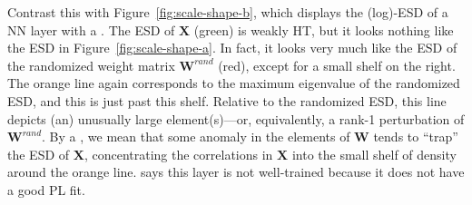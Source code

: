 Contrast this with Figure~\ref{fig:scale-shape-b}, which displays the (log)-ESD of a NN layer with a \CorrelationTrap.
The ESD of $\mathbf{X}$ (green) is weakly HT, but it looks nothing like the ESD in Figure~\ref{fig:scale-shape-a}.
In fact, it looks very much like the ESD of the randomized weight matrix  $\mathbf{W}^{rand}$ (red), except for a small shelf on the right. 
The orange line again corresponds to the maximum eigenvalue of the randomized ESD, and this is just past this shelf.
Relative to the randomized ESD, this line depicts (an) unusually large element(s)---or, equivalently, a rank-1 perturbation of $\mathbf{W}^{rand}$.
By a \CorrelationTrap, we mean that some anomaly in the elements of $\mathbf{W}$ tends to ``trap'' the ESD of $\mathbf{X}$, concentrating the correlations in $\mathbf{X}$ into the small shelf of density around the orange line. 
\HTSR says this layer is not well-trained because it does not have a good PL fit.





 



